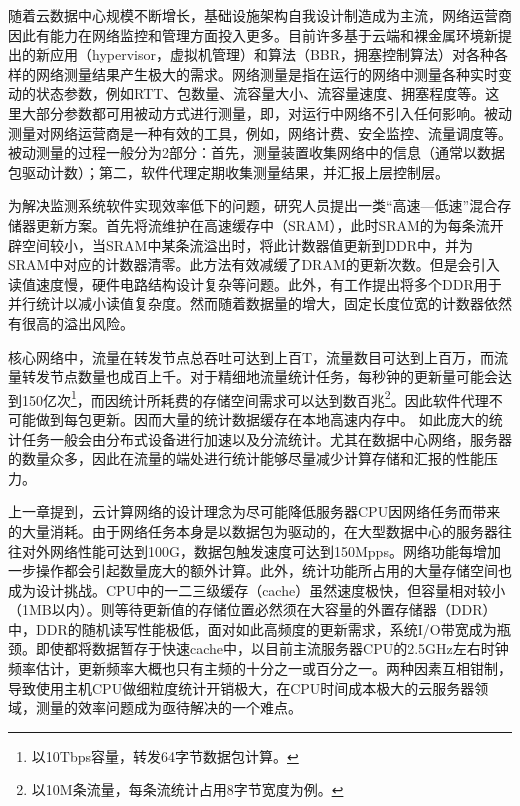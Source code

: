 

随着云数据中心规模不断增长，基础设施架构自我设计制造成为主流，网络运营商因此有能力在网络监控和管理方面投入更多。目前许多基于云端和裸金属环境新提出的新应用（hypervisor，虚拟机管理）和算法（BBR，拥塞控制算法）对各种各样的网络测量结果产生极大的需求。网络测量是指在运行的网络中测量各种实时变动的状态参数，例如RTT、包数量、流容量大小、流容量速度、拥塞程度等。这里大部分参数都可用被动方式进行测量，即，对运行中网络不引入任何影响。被动测量对网络运营商是一种有效的工具，例如，网络计费、安全监控、流量调度等。被动测量的过程一般分为2部分：首先，测量装置收集网络中的信息（通常以数据包驱动计数）；第二，软件代理定期收集测量结果，并汇报上层控制层。


为解决监测系统软件实现效率低下的问题，研究人员提出一类“高速---低速”混合存储器更新方案。首先将流维护在高速缓存中（SRAM），此时SRAM的为每条流开辟空间较小，当SRAM中某条流溢出时，将此计数器值更新到DDR中，并为SRAM中对应的计数器清零。此方法有效减缓了DRAM的更新次数。但是会引入读值速度慢，硬件电路结构设计复杂等问题。此外，有工作提出将多个DDR用于并行统计以减小读值复杂度。然而随着数据量的增大，固定长度位宽的计数器依然有很高的溢出风险。

核心网络中，流量在转发节点总吞吐可达到上百T，流量数目可达到上百万，而流量转发节点数量也成百上千。对于精细地流量统计任务，每秒钟的更新量可能会达到150亿次\footnote{以10Tbps容量，转发64字节数据包计算。}，而因统计所耗费的存储空间需求可以达到数百兆\footnote{以10M条流量，每条流统计占用8字节宽度为例。}。因此软件代理不可能做到每包更新。因而大量的统计数据缓存在本地高速内存中。
如此庞大的统计任务一般会由分布式设备进行加速以及分流统计。尤其在数据中心网络，服务器的数量众多，因此在流量的端处进行统计能够尽量减少计算存储和汇报的性能压力。

上一章提到，云计算网络的设计理念为尽可能降低服务器CPU因网络任务而带来的大量消耗。由于网络任务本身是以数据包为驱动的，在大型数据中心的服务器往往对外网络性能可达到100G，数据包触发速度可达到150Mpps。网络功能每增加一步操作都会引起数量庞大的额外计算。此外，统计功能所占用的大量存储空间也成为设计挑战。CPU中的一二三级缓存（cache）虽然速度极快，但容量相对较小（1MB以内）。则等待更新值的存储位置必然须在大容量的外置存储器（DDR）中，DDR的随机读写性能极低，面对如此高频度的更新需求，系统I/O带宽成为瓶颈。即使都将数据暂存于快速cache中，以目前主流服务器CPU的2.5GHz左右时钟频率估计，更新频率大概也只有主频的十分之一或百分之一。两种因素互相钳制，导致使用主机CPU做细粒度统计开销极大，在CPU时间成本极大的云服务器领域，测量的效率问题成为亟待解决的一个难点。


